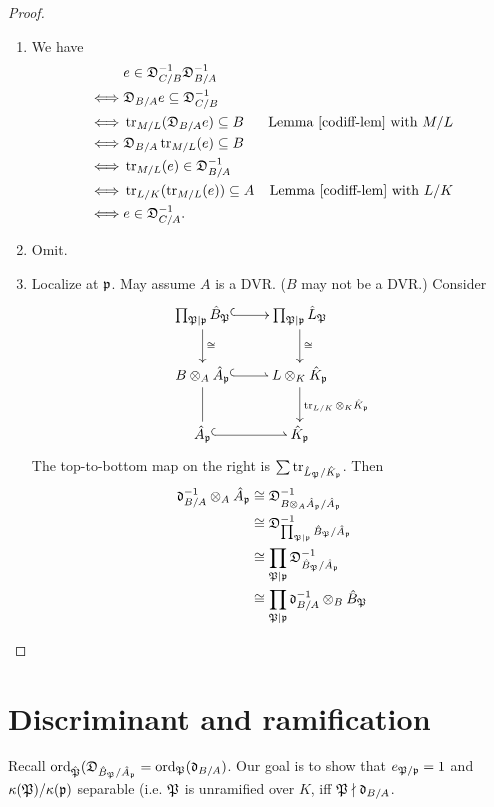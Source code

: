 \begin{proof}
\begin{enumerate}
\item
We have
\begin{align*}
&e\in \mathfrak D_{C/B}^{-1} \mathfrak D_{B/A}^{-1}\\
\iff & \mathfrak D_{B/A} e\subseteq \mathfrak D_{C/B}^{-1}\\
{\iff}& \operatorname{tr}_{M/L}(\mathfrak D_{B/A}e)\subseteq B&\text{Lemma~\ref{codiff-lem} with $M/L$}\\
\iff & \mathfrak D_{B/A} \operatorname{tr}_{M/L}(e)\subseteq B\\
\iff & \operatorname{tr}_{M/L}(e)\in \mathfrak D_{B/A}^{-1}\\
\iff & \operatorname{tr}_{L/K}(\operatorname{tr}_{M/L}(e))\subseteq A&\text{Lemma~\ref{codiff-lem} with $L/K$}\\
\iff & e\in \mathfrak D_{C/A}^{-1}.
\end{align*}
\item Omit.
\item Localize at $\mathfrak{p}$. May assume $A$ is a DVR. ($B$ may not be a DVR.) Consider
\[
\xymatrix{
\prod_{\mP\mid \mfp} \hat{B}_{\mP} \ar[d]^{\cong} \ar@{^(->}[r]& \prod_{\mP\mid \mfp} \hat{L}_{\mP}\ar[d]^{\cong}\\
B\ot_A \hat{A}_{\mfp}\ar@{-}[d]\ar@^{(->}[r] & L\ot_K \hat{K}_{\mfp}\ar[d]^{\tr_{L/K}\ot_K \hat{K}_{\mfp}}\\
\hat{A}_{\mfp} \ar@^{(->}[r] & \hat{K}_{\mfp}
}
\]
The top-to-bottom map on the right is $\sum \operatorname{tr}_{\hat{L}_{\mathfrak{P}}/\hat{K}_{\mathfrak{p}}}$. Then
\begin{align*}
\mathfrak {\mathfrak d}_{B/A}^{-1} \otimes_A \hat{A}_{\mathfrak{p}}
&\cong \mathfrak D^{-1}_{B\otimes_A \hat{A}_{\mathfrak{p}}/\hat{A}_{\mathfrak{p}}}\\
&\cong \mathfrak D^{-1}_{\prod_{\mathfrak{P}\mid \mathfrak{p}}\hat{B}_{\mathfrak{P}}/\hat{A}_{\mathfrak{p}}}\\
&\cong \prod_{\mathfrak{P}\mid \mathfrak{p}} \mathfrak D^{-1}_{\hat{B}_{\mathfrak{P}}/\hat{A}_{\mathfrak{p}}}\\
&\cong \prod_{\mathfrak{P}\mid \mathfrak{p}} \mathfrak {\mathfrak d}_{B/A}^{-1}\otimes_B \hat{B}_{\mathfrak{P}}
\end{align*}
\end{enumerate}
\end{proof}
\section{Discriminant and ramification}
Recall $\operatorname{ord}_{\hat{\mathfrak{P}}} (\mathfrak D_{\hat B_{\mathfrak{P}}/\hat A_{\mathfrak{p}}} = \operatorname{ord}_{\mathfrak{P}} (\mathfrak {\mathfrak d}_{B/A})$.
Our goal is to show that $e_{\mathfrak{P}/\mathfrak{p}}=1$ and $\kappa(\mathfrak{P})/\kappa(\mathfrak{p})$ separable (i.e. $\mathfrak{P}$ is unramified over $K$, iff $\mathfrak{P}\nmid \mathfrak {\mathfrak d}_{B/A}$.

